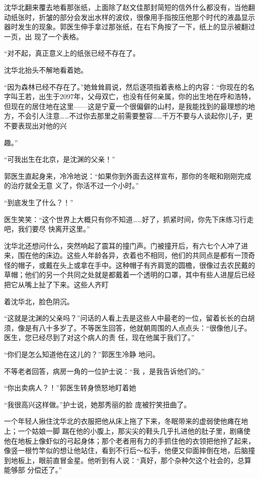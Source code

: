 \documentclass{article}
\begin{document}
沈华北翻来覆去地看那张纸，上面除了赵文佳那封简短的信外什么都没有，当他翻动纸张时，折皱的部分会发出水样的波纹，很像用手指按压他那个时代的液晶显示器时发生的现象。郭医生伸手拿过那张纸，在右下角按了一下，纸上的显示被翻过一页，出
现了一个表格。 

“对不起，真正意义上的纸张已经不存在了。


沈华北抬头不解地看着她。 

“因为森林已经不存在了。”她耸耸肩说，然后逐项指着表格上的内容：“你现在的名字叫王若，出生于2097年，父母双亡，也没有任何亲属，你的出生地在呼和浩特，但现在的居住地在这里——这是宁夏一个很偏僻的山村，是我能找到的最理想的地方，不会引人注意……不过你去那里之前需要整容……千万不要与人谈起你儿子，更不要表现出对他的兴
\newpage

趣。” 


“可我出生在北京，是沈渊的父亲！” 

郭医生直起身来，冷冷地说：“如果你到外面去这样宣布，那你的冬眠和刚刚完成的治疗就全无意
义了，你活不过一个小时。” 


“到底发生了什么？！” 

医生笑笑：“这个世界上大概只有你不知道……好了，抓紧时间，你先下床练习行走吧，我们要尽
快离开这里。” 

沈华北还想问什么，突然响起了震耳的撞门声。门被撞开后，有六七个人冲了进来，围在他的床边。这些人年龄各异，衣着也不相同，他们的共同点是都有一顶奇怪的帽子，或戴在头上或拿在手中。这种帽子有齐肩宽的圆檐，很像过去农民戴的草帽；他们的另一个共同之处就是都戴着一个透明的口罩，其中有些人进屋后已经把它从嘴上扯了下来。这些人齐盯
\newpage

着沈华北，脸色阴沉。 

“这就是沈渊的父亲吗？”问话的人看上去是这些人中最老的一位，留着长长的白胡须，像是有八十多岁了。不等医生回答，他就朝周围的人点点头：“很像他儿子。医生，您已经尽到了对这个病人的责
任，现在他属于我们了。” 

“你们是怎么知道他在这儿的？”郭医生冷静
地问。 

不等老者回答，病房一角的一位护士说：“我
，是我告诉他们的。” 

“你出卖病人？！”郭医生转身愤怒地盯着她

“我很高兴这样做。”护士说，她那秀丽的脸
庞被狞笑扭曲了。 

一个年轻人揪住沈华北的衣服把他从床上拖了下来，冬眠带来的虚弱使他瘫在地上；一个姑娘一脚
\newpage
踹在他的小腹上，那尖尖的鞋头几乎扎进他的肚子里，剧痛使他在地板上像虾似的弓起身体；那个老者用有力的手抓住他的衣领把他拎了起来，像竖一根竹竿似的想让他站住，看到不行后～松手，他便又仰面摔倒在地，后脑撞到地板上，眼前直冒金星。他听到有人说：“真好，那个杂种欠这个社会的，总算能够部
分偿还了。” 
\end{document}
